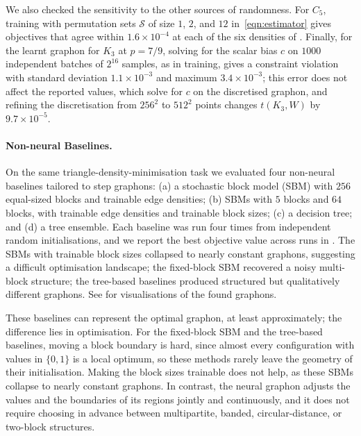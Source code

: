 \documentclass[11pt]{article}
\theoremstyle{plain}
\theoremstyle{definition}
\theoremstyle{remark}
\begin{document}
We also checked the sensitivity to the other sources of randomness. For $C_5$, training with permutation sets $\mathcal{S}$ of size $1$, $2$, and $12$ in~\eqref{eqn:estimator} gives objectives that agree within $1.6 \times 10^{-4}$ at each of the six densities of . Finally, for the learnt graphon for $K_3$ at $p = 7/9$, solving for the scalar bias $c$ on $1000$ independent batches of $2^{16}$ samples, as in training, gives a constraint violation with standard deviation $1.1 \times 10^{-3}$ and maximum $3.4 \times 10^{-3}$; this error does not affect the reported values, which solve for $c$ on the discretised graphon, and refining the discretisation from $256^2$ to $512^2$ points changes $t(K_3, W)$ by $9.7 \times 10^{-5}$.

\paragraph{Non-neural Baselines.}
On the same triangle-density-minimisation task we evaluated four non-neural baselines tailored to step graphons: (a) a stochastic block model (SBM) with $256$ equal-sized blocks and trainable edge densities; (b) SBMs with $5$ blocks and $64$ blocks, with trainable edge densities and trainable block sizes; (c) a decision tree; and (d) a tree ensemble.
Each baseline was run four times from independent random initialisations, and we report the best objective value across runs in .
The SBMs with trainable block sizes collapsed to nearly constant graphons, suggesting a difficult optimisation landscape; the fixed-block SBM recovered a noisy multi-block structure; the tree-based baselines produced structured but qualitatively different graphons. See  for visualisations of the found graphons.

These baselines can represent the optimal graphon, at least approximately; the difference lies in optimisation. For the fixed-block SBM and the tree-based baselines, moving a block boundary is hard, since almost every configuration with values in $\{0, 1\}$ is a local optimum, so these methods rarely leave the geometry of their initialisation. Making the block sizes trainable does not help, as these SBMs collapse to nearly constant graphons. In contrast, the neural graphon adjusts the values and the boundaries of its regions jointly and continuously, and it does not require choosing in advance between multipartite, banded, circular-distance, or two-block structures.
\end{document}
